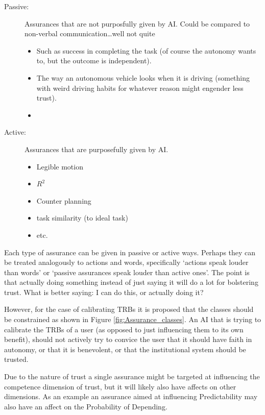     \begin{description}
        \item [Passive:] Assurances that are not purposfully given by AI. Could be compared to non-verbal communication\ldots well not quite
        \begin{itemize}
            \item Such as success in completing the task (of course the autonomy wants to, but the outcome is independent).
            \item The way an autonomous vehicle looks when it is driving (something with weird driving habits for whatever reason might engender less trust). 
            \item 
        \end{itemize}
        \item [Active:] Assurances that are purposefully given by AI.
        \begin{itemize}
            \item Legible motion
            \item $R^2$
            \item Counter planning
            \item task similarity (to ideal task)
            \item etc.
        \end{itemize}
    \end{description}

    Each type of assurance can be given in passive or active ways. Perhaps they can be treated analogously to actions and words, specifically `actions speak louder than words' or `passive assurances speak louder than active ones'. The point is that actually doing something instead of just saying it will do a lot for bolstering trust. What is better saying: I can do this, or actually doing it?

    However, for the case of calibrating TRBs it is proposed that the classes should be constrained as shown in Figure \ref{fig:Assurance_classes}. An AI that is trying to calibrate the TRBs of a user (as opposed to just influencing them to its own benefit), should not actively try to convice the user that it should have faith in autonomy, or that it is benevolent, or that the institutional system should be trusted.

    Due to the nature of trust a single assurance might be targeted at influencing the competence dimension of trust, but it will likely also have affects on other dimensions. As an example an assurance aimed at influencing Predictability may also have an affect on the Probability of Depending.

